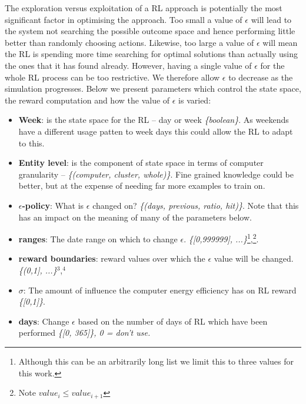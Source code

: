 \documentclass[10pt, conference, compsocconf]{IEEEtran}
\begin{document}
The exploration versus exploitation of a RL approach is potentially the most significant factor in optimising the approach. Too small a value of $\epsilon$ will lead to the system not searching the possible outcome space and hence performing little better than randomly choosing actions. Likewise, too large a value of $\epsilon$ will mean the RL is spending more time searching for optimal solutions than actually using the ones that it has found already. However, having a single value of $\epsilon$ for the whole RL process can be too restrictive. We therefore allow $\epsilon$ to decrease as the simulation progresses. Below we present parameters which control the state space, the reward computation and  how the value of $\epsilon$ is varied:%
\begin{itemize}
	\item {\bf Week}: is the state space for the RL -- day or week {\em \{boolean\}}. As weekends have a different usage patten to week days this could allow the RL to adapt to this.
	\item {\bf Entity level}: is the component of state space in terms of computer granularity -- {\em \{(computer, cluster, whole)\}}. Fine grained knowledge could be better, but at the expense of needing far more examples to train on. %
	\item {\bf $\epsilon$-policy}: What is $\epsilon$ changed on? {\em \{(days, previous, ratio, hit)\}}. Note that this has an impact on the meaning of many of the parameters below.
	\item {\bf ranges}: The date range on which to change $\epsilon$. {\em \{[0,999999], ...\}}\footnote{Although this can be an arbitrarily long list we limit this to three values for this work.},\footnote{Note $value_i \leq value_{i+1}$}.
	\item {\bf reward boundaries}: reward values over which the $\epsilon$ value will be changed. {\em \{(0,1], ...\}}$^3$,$^4$
	\item {\bf $\sigma$}: The amount of influence the computer energy efficiency has on RL reward {\em \{[0,1]\}}.
	\item {\bf days}: Change $\epsilon$ based on the number of days of RL which have been performed {\em \{[0, 365]\}, 0 = don't use.}

\end{itemize}
\end{document}
